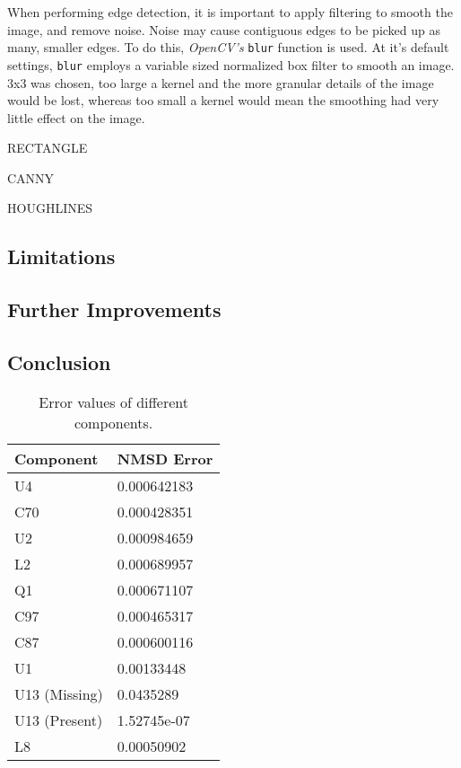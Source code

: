 \documentclass[conference]{IEEEtran}
\begin{document}
When performing edge detection, it is important to apply filtering to smooth the image, and remove noise. Noise may cause contiguous edges to be picked up as many, smaller edges.  To do this, \textit{OpenCV's} \verb|blur| function is used. At it's default settings, \verb|blur| employs a variable sized normalized box filter to smooth an image\cite{BlurDocs}. $3$x$3$ was chosen, too large a kernel and the more granular details of the image would be lost, whereas too small a kernel would mean the smoothing had very little effect on the image.

RECTANGLE

CANNY

HOUGHLINES


\subsection{Limitations}\label{sec:t2_lim}

\subsection{Further Improvements}

\subsection{Conclusion}

\begin{table}[]
\caption{Error values of different components.}
\label{tab:t3error}
\begin{tabular}{|l|l|}
\hline
\textbf{Component} & \textbf{NMSD Error} \\ \hline
U4                 & 0.000642183         \\ \hline
C70                & 0.000428351         \\ \hline
U2                 & 0.000984659         \\ \hline
L2                 & 0.000689957         \\ \hline
Q1                 & 0.000671107         \\ \hline
C97                & 0.000465317         \\ \hline
C87                & 0.000600116         \\ \hline
U1                 & 0.00133448          \\ \hline
U13 (Missing)      & 0.0435289           \\ \hline
U13 (Present)      & 1.52745e-07         \\ \hline
L8                 & 0.00050902          \\ \hline
\end{tabular}
\end{table}
\end{document}
